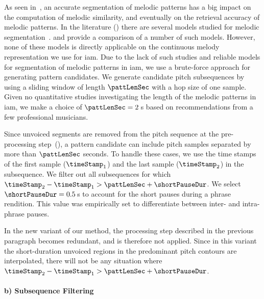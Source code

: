 As seen in~, an accurate segmentation of melodic patterns has a big impact on the computation of melodic similarity, and eventually on the retrieval accuracy of melodic patterns. In the literature () there are several models studied for melodic segmentation~\citep{Cambouropoulos2006,muller2009robust,cambouropoulos2001local}. \cite{pearce2008comparison} and \cite{rodriguez2014comparing} provide a comparison of a number of such models. However, none of these models is directly applicable on the continuous melody representation we use for \gls{iam}. Due to the lack of such studies and reliable models for segmentation of melodic patterns in \gls{iam}, we use a brute-force approach for generating pattern candidates. We generate candidate pitch subsequences by using a sliding window of length $\pattLenSec$ with a hop size of one sample. Given no quantitative studies investigating the length of the melodic patterns in \gls{iam}, we make a choice of $\pattLenSec = 2$\,s based on recommendations from a few professional musicians.

Since unvoiced segments are removed from the pitch sequence at the pre-processing step~(), a pattern candidate can include pitch samples separated by more than $\pattLenSec$ seconds. To handle these cases, we use the time stamps of the first sample ($\timeStamp_1$) and the last sample ($\timeStamp_2$) in the subsequence. We filter out all subsequences for which $\timeStamp_2-\timeStamp_1 > \pattLenSec + \shortPauseDur$. We select $\shortPauseDur =0.5$\,s to account for the short pauses during a phrase rendition. This value was empirically set to differentiate between inter- and intra-phrase pauses. 

In the new variant of our method, the processing step described in the previous paragraph becomes redundant, and is therefore not applied. Since in this variant the short-duration unvoiced regions in the predominant pitch contours are interpolated, there will not be any situation where $\timeStamp_2-\timeStamp_1 > \pattLenSec + \shortPauseDur$. 


\paragraph{b) Subsequence Filtering} 

